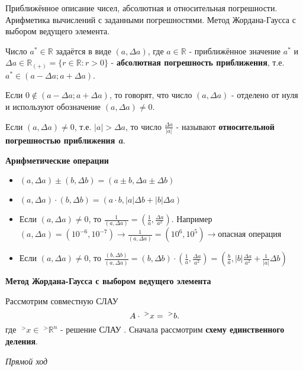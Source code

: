 \documentclass[__main__.tex]{subfiles}
\begin{document}
Приближённое описание чисел, абсолютная и относительная погрешности. Арифметика вычислений с заданными погрешностями. Метод Жордана-Гаусса с выбором ведущего элемента.

Число $a^{*} \in \mathbb{R}$ задаётся в виде $(a,\Delta a)$, где $a \in \mathbb{R}$ - приближённое значение $a^{*}$ и $\Delta a \in \mathbb{R}_{(+)} = \lbrace r \in \mathbb{R}: r>0 \rbrace$ - \textbf{абсолютная погрешность приближения}, т.е. $a^{*} \in (a - \Delta a; a + \Delta a)$.

Если $0 \notin (a - \Delta a; a + \Delta a)$, то говорят, что число $(a,\Delta a)$ - отделено от нуля и используют обозначение $(a,\Delta a) \neq 0$.

Если $(a,\Delta a) \neq 0$, т.е. $|a| > \Delta a$, то число $\frac{\Delta a}{|a|}$ - называют \textbf{относительной погрешностью приближения \textit{a}}.

\textbf{Арифметические операции}
\begin{itemize}
	\item 
	$(a,\Delta a) \pm (b,\Delta b) = (a \pm b,\Delta a \pm \Delta b) $ 
	
	\item 
	$(a,\Delta a) \cdot (b,\Delta b) = (a \cdot b,|a| \Delta b + |b| \Delta a) $
	
	\item 
	Если $(a,\Delta a) \neq 0$, то $\frac{1}{(a,\Delta a)} = \left(\frac{1}{a}, \frac{\Delta a}{a^2} \right)$. Например $(a,\Delta a) = (10^{-6},10^{-7}) \rightarrow \frac{1}{(a,\Delta a)} = (10^6,10^5) \rightarrow \text{опасная операция}$
	
	\item
	Если $(a,\Delta a) \neq 0$, то $\frac{(b, \Delta b)}{(a, \Delta a)} = (b,\Delta b) \cdot \left( \frac{1}{a}, \frac{\Delta a}{a^2} \right) = \left( \frac{b}{a}, |b| \frac{\Delta a}{a^2} + \frac{1}{|a|} \Delta b \right)$
\end{itemize}

\textbf{Метод Жордана-Гаусса с выбором ведущего элемента}

Рассмотрим совместную СЛАУ
\begin{equation}
\llabel{1_1}
A \cdot \;^{>}x = \;^{>}b.
\end{equation}
где $\;^{>}x \in \;^{>}\mathbb{R}^n$ - решение СЛАУ . Сначала рассмотрим \textbf{схему единственного деления}.

\textit{Прямой ход}
\end{document}
